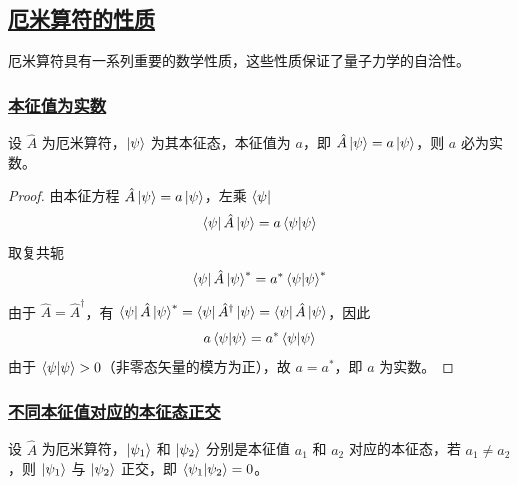 \subsection{\protect\hyperlink{:}{厄米算符的性质}}

厄米算符具有一系列重要的数学性质，这些性质保证了量子力学的自洽性。

\subsubsection{\protect\hyperlink{:}{本征值为实数}}

\begin{theorem}[厄米算符的本征值为实数]
    设 $\hat{A}$ 为厄米算符，$\ket{\psi}$ 为其本征态，本征值为 $a$，即 $\hat{A}\ket{\psi} = a\ket{\psi}$，则 $a$ 必为实数。
\end{theorem}

\begin{proof}
    由本征方程 $\hat{A}\ket{\psi} = a\ket{\psi}$，左乘 $\bra{\psi}$
    \begin{equation}
        \bra{\psi}\hat{A}\ket{\psi} = a\bra{\psi}\ket{\psi}
    \end{equation}
    取复共轭
    \begin{equation}
        \bra{\psi}\hat{A}\ket{\psi}^* = a^*\bra{\psi}\ket{\psi}^*
    \end{equation}
    由于 $\hat{A} = \hat{A}^\dagger$，有 $\bra{\psi}\hat{A}\ket{\psi}^* = \bra{\psi}\hat{A}^\dagger\ket{\psi} = \bra{\psi}\hat{A}\ket{\psi}$，因此
    \begin{equation}
        a\bra{\psi}\ket{\psi} = a^*\bra{\psi}\ket{\psi}
    \end{equation}
    由于 $\bra{\psi}\ket{\psi} > 0$（非零态矢量的模方为正），故 $a = a^*$，即 $a$ 为实数。
\end{proof}

\subsubsection{\protect\hyperlink{:}{不同本征值对应的本征态正交}}

\begin{theorem}[厄米算符本征态的正交性]
    设 $\hat{A}$ 为厄米算符，$\ket{\psi_1}$ 和 $\ket{\psi_2}$ 分别是本征值 $a_1$ 和 $a_2$ 对应的本征态，若 $a_1 \neq a_2$，则 $\ket{\psi_1}$ 与 $\ket{\psi_2}$ 正交，即 $\braket{\psi_1}{\psi_2} = 0$。
\end{theorem}

